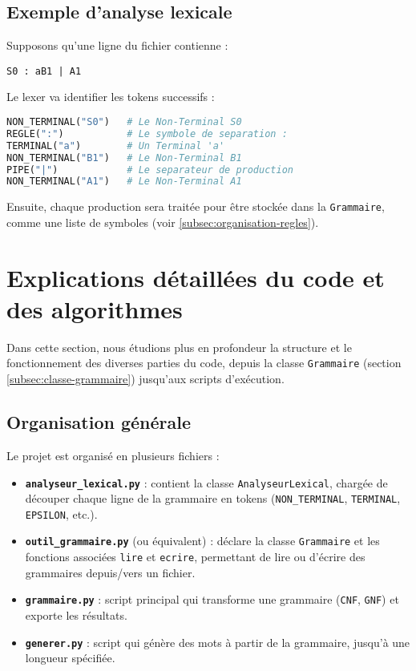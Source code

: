 \documentclass[a4paper,12pt]{article}
\begin{document}
\subsection{Exemple d’analyse lexicale}
\label{subsec:exemple-lexical}
Supposons qu’une ligne du fichier contienne :
\begin{verbatim}
S0 : aB1 | A1
\end{verbatim}
Le lexer va identifier les tokens successifs :
\begin{lstlisting}[language=python, caption={Exemple d’analyse lexicale}, label={lst:exemple-lexical}]
NON_TERMINAL("S0")   # Le Non-Terminal S0
REGLE(":")           # Le symbole de separation :
TERMINAL("a")        # Un Terminal 'a'
NON_TERMINAL("B1")   # Le Non-Terminal B1
PIPE("|")            # Le separateur de production
NON_TERMINAL("A1")   # Le Non-Terminal A1
\end{lstlisting}

Ensuite, chaque production sera traitée pour être stockée dans la \texttt{Grammaire}, 
comme une liste de symboles (voir \ref{subsec:organisation-regles}).

\section{Explications détaillées du code et des algorithmes}
\label{sec:explications-code}

Dans cette section, nous étudions plus en profondeur la structure et le fonctionnement des diverses parties du code, depuis la classe \texttt{Grammaire} (section \ref{subsec:classe-grammaire}) jusqu’aux scripts d’exécution.

\subsection{Organisation générale}
\label{subsec:organisation-generale}

Le projet est organisé en plusieurs fichiers :
\begin{itemize}
    \item \textbf{\texttt{analyseur\_lexical.py}} : contient la classe \texttt{AnalyseurLexical}, chargée de découper chaque ligne de la grammaire en tokens (\texttt{NON\_TERMINAL}, \texttt{TERMINAL}, \texttt{EPSILON}, etc.).
    \item \textbf{\texttt{outil\_grammaire.py}} (ou équivalent) : déclare la classe \texttt{Grammaire} et les fonctions associées \texttt{lire} et \texttt{ecrire}, permettant de lire ou d’écrire des grammaires depuis/vers un fichier.
    \item \textbf{\texttt{grammaire.py}} : script principal qui transforme une grammaire (\texttt{CNF}, \texttt{GNF}) et exporte les résultats.
    \item \textbf{\texttt{generer.py}} : script qui génère des mots à partir de la grammaire, jusqu’à une longueur spécifiée.
\end{itemize}
\end{document}
